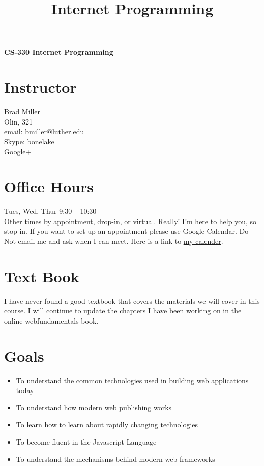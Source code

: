 \documentclass[11pt,twocolumn]{article}
\title{Internet Programming}
\author{}
\begin{document}
\begin{center}
	{\sffamily\LARGE\bfseries CS-330 Internet Programming}
\end{center}

\section*{Instructor}
Brad Miller \\
Olin, 321 \\
email:  bmiller@luther.edu \\
Skype:  bonelake \\
Google+ \\

\section*{Office Hours}
Tues, Wed, Thur 9:30 -- 10:30   \\
Other times by appointment, drop-in, or virtual.  Really! I'm here to help you, so stop in.  If you want to set up an appointment please use Google Calendar.  Do Not email me and ask when I can meet.  Here is a link to \href{https://calendar.google.com/calendar/embed?src=millbr02%40luther.edu&ctz=America/Chicago}{\underline{my calender}}.

\section*{Text Book}

I have never found a good textbook that covers the materials we will cover in this course.  I will continue to update the chapters I have been working on in the online webfundamentals book.

\section*{Goals}

\begin{itemize}
    \item To understand the common technologies used in building web applications today
    \item To understand how modern web publishing works
    \item To learn how to learn about rapidly changing technologies
    \item To become fluent in the Javascript Language
    \item To understand the mechanisms behind modern web frameworks
\end{itemize}
\end{document}
